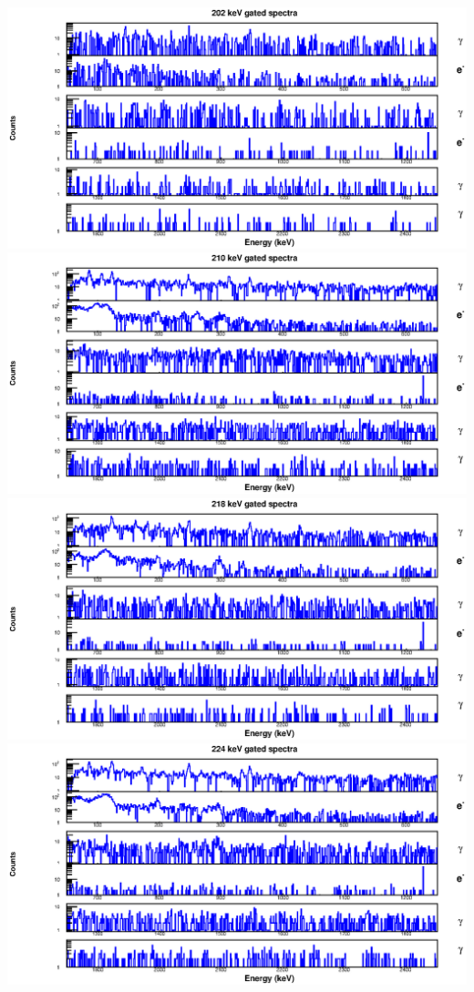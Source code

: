 \begin{landscape}
\includegraphics[scale=1.2]{154Gd_Appendix/202_combined.eps}
\includegraphics[scale=1.2]{154Gd_Appendix/210_combined.eps}
\includegraphics[scale=1.2]{154Gd_Appendix/218_combined.eps}
\includegraphics[scale=1.2]{154Gd_Appendix/224_combined.eps}

\end{landscape}

